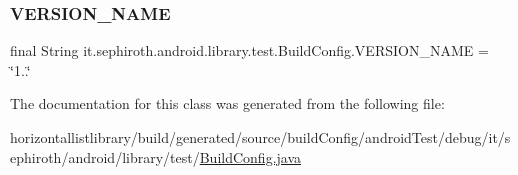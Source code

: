 \subsubsection{\texorpdfstring{V\+E\+R\+S\+I\+O\+N\+\_\+\+N\+A\+ME}{VERSION\_NAME}}
{\footnotesize\ttfamily final String it.\+sephiroth.\+android.\+library.\+test.\+Build\+Config.\+V\+E\+R\+S\+I\+O\+N\+\_\+\+N\+A\+ME = \char`\"{}1..\char`\"{}\hspace{0.3cm}{\ttfamily [static]}}



The documentation for this class was generated from the following file\+:\begin{DoxyCompactItemize}
\item 
horizontallistlibrary/build/generated/source/build\+Config/android\+Test/debug/it/sephiroth/android/library/test/\hyperlink{horizontallistlibrary_2build_2generated_2source_2build_config_2android_test_2debug_2it_2sephirote4c94bf8f9ee1fef28f9cae07127120d}{Build\+Config.\+java}\end{DoxyCompactItemize}
